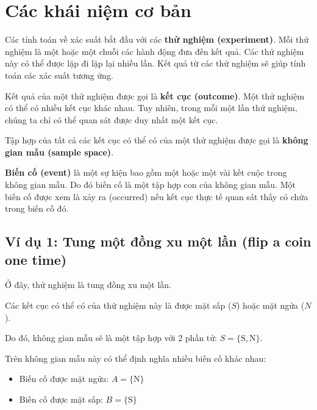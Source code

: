 \documentclass[
]{book}
\providecommand{\tightlist}{%
  \setlength{\itemsep}{0pt}\setlength{\parskip}{0pt}}
\begin{document}
\hypertarget{cuxe1c-khuxe1i-niux1ec7m-cux1a1-bux1ea3n}{%
\section{Các khái niệm cơ bản}\label{cuxe1c-khuxe1i-niux1ec7m-cux1a1-bux1ea3n}}

Các tính toán về xác suất bắt đầu với các \textbf{thử nghiệm (experiment)}. Mỗi thử nghiệm là một hoặc một chuỗi các hành động đưa đến kết quả. Các thử nghiệm này có thể được lặp đi lặp lại nhiều lần. Kết quả từ các thử nghiệm sẽ giúp tính toán các xác suất tương ứng.

Kết quả của một thử nghiệm được gọi là \textbf{kết cục (outcome)}. Một thử nghiệm có thể có nhiều kết cục khác nhau. Tuy nhiên, trong mỗi một lần thử nghiệm, chúng ta chỉ có thể quan sát được duy nhất một kết cục.

Tập hợp của tất cả các kết cục có thể có của một thử nghiệm được gọi là \textbf{không gian mẫu (sample space)}.

\textbf{Biến cố (event)} là một sự kiện bao gồm một hoặc một vài kết cuộc trong không gian mẫu. Do đó biến cố là một tập hợp con của không gian mẫu. Một biến cố được xem là xảy ra (occurred) nếu kết cục thực tế quan sát thấy có chứa trong biến cố đó.

\hypertarget{vuxed-dux1ee5-1-tung-mux1ed9t-ux111ux1ed3ng-xu-mux1ed9t-lux1ea7n-flip-a-coin-one-time}{%
\subsection{Ví dụ 1: Tung một đồng xu một lần (flip a coin one time)}\label{vuxed-dux1ee5-1-tung-mux1ed9t-ux111ux1ed3ng-xu-mux1ed9t-lux1ea7n-flip-a-coin-one-time}}

Ở đây, thử nghiệm là tung đồng xu một lần.

Các kết cục có thể có của thử nghiệm này là được mặt sấp (\(S\)) hoặc mặt ngửa (\(N\)).

Do đó, không gian mẫu sẽ là một tập hợp với 2 phần tử: \(S = \{\text{S},\text{N} \}\).

Trên không gian mẫu này có thể định nghĩa nhiều biến cố khác nhau:

\begin{itemize}
\tightlist
\item
  Biến cố được mặt ngửa: \(A = \{\text{N}\}\)
\item
  Biến cố được mặt sấp: \(B = \{\text{S}\}\)
\end{itemize}
\end{document}
